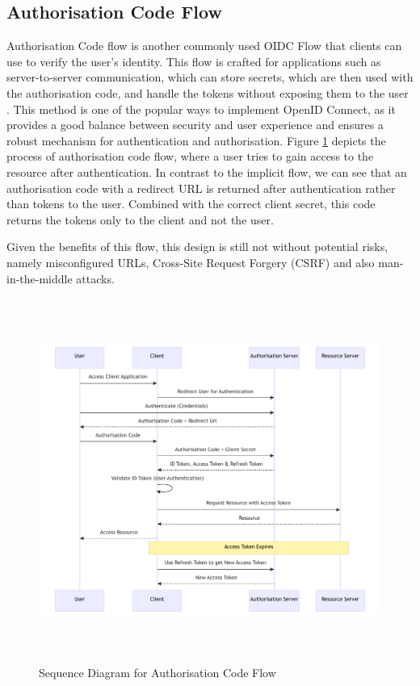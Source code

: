 \subsection{Authorisation Code Flow}
Authorisation Code flow is another commonly used OIDC Flow that clients can use to verify the user's identity.
This flow is crafted for applications such as server-to-server communication, which can store secrets, which are then used with the authorisation code, and handle the tokens without exposing them to the user \citep{auth_flow_oidc}.
This method is one of the popular ways to implement OpenID Connect, as it provides a good balance between security and user experience and ensures a robust mechanism for authentication and authorisation.
Figure \ref{fig:authorisation_flow} depicts the process of authorisation code flow, where a user tries to gain access to the resource after authentication.
In contrast to the implicit flow, we can see that an authorisation code with a redirect URL is returned after authentication rather than tokens to the user.
Combined with the correct client secret, this code returns the tokens only to the client and not the user. 

Given the benefits of this flow, this design is still not without potential risks, namely misconfigured URLs, Cross-Site Request Forgery (CSRF) and also man-in-the-middle attacks. 

\begin{figure}[h!]
\centering
\includegraphics[width=\textwidth, height=450px]{pics/authorization_code.pdf}
\caption{Sequence Diagram for Authorisation Code Flow}
\label{fig:authorisation_flow}
\end{figure}

